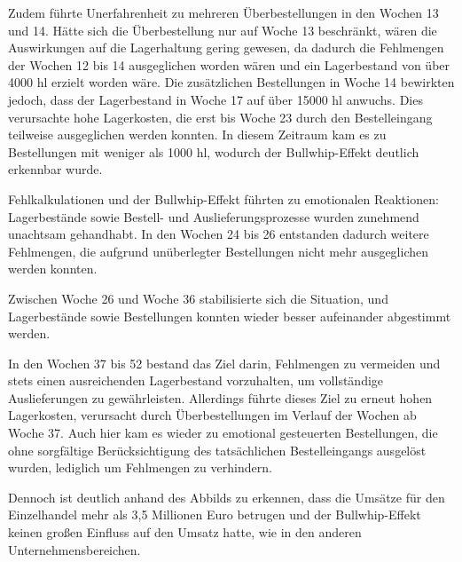 \documentclass[a4paper,12pt]{article}
\begin{document}
Zudem führte Unerfahrenheit zu mehreren Überbestellungen in den Wochen 13 und 14.
Hätte sich die Überbestellung nur auf Woche 13 beschränkt, wären die Auswirkungen auf die Lagerhaltung gering gewesen,
da dadurch die Fehlmengen der Wochen 12 bis 14 ausgeglichen worden wären und ein Lagerbestand von über 4000 hl erzielt worden wäre.
Die zusätzlichen Bestellungen in Woche 14 bewirkten jedoch, dass der Lagerbestand in Woche 17 auf über 15000 hl anwuchs.
Dies verursachte hohe Lagerkosten, die erst bis Woche 23 durch den Bestelleingang teilweise ausgeglichen werden konnten.
In diesem Zeitraum kam es zu Bestellungen mit weniger als 1000 hl, wodurch der Bullwhip-Effekt deutlich erkennbar wurde.

Fehlkalkulationen und der Bullwhip-Effekt führten zu emotionalen Reaktionen: Lagerbestände sowie Bestell- und Auslieferungsprozesse wurden zunehmend unachtsam gehandhabt.
In den Wochen 24 bis 26 entstanden dadurch weitere Fehlmengen, die aufgrund unüberlegter Bestellungen nicht mehr ausgeglichen werden konnten.

Zwischen Woche 26 und Woche 36 stabilisierte sich die Situation, und Lagerbestände sowie Bestellungen konnten wieder besser aufeinander abgestimmt werden.

In den Wochen 37 bis 52 bestand das Ziel darin, Fehlmengen zu vermeiden und stets einen ausreichenden Lagerbestand vorzuhalten,
um vollständige Auslieferungen zu gewährleisten.
Allerdings führte dieses Ziel zu erneut hohen Lagerkosten, verursacht durch Überbestellungen im Verlauf der Wochen ab Woche 37.
Auch hier kam es wieder zu emotional gesteuerten Bestellungen, die ohne sorgfältige Berücksichtigung des tatsächlichen Bestelleingangs ausgelöst wurden, lediglich um Fehlmengen zu verhindern.


Dennoch ist deutlich anhand des Abbilds zu erkennen, dass die Umsätze für den Einzelhandel mehr als 3,5 Millionen Euro betrugen
und der Bullwhip-Effekt keinen großen Einfluss auf den Umsatz hatte, wie in den anderen Unternehmensbereichen.
\end{document}
